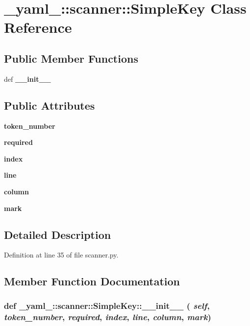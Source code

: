 \section{\_\-yaml\_\-::scanner::SimpleKey Class Reference}
\label{class__yaml___1_1scanner_1_1SimpleKey}
\subsection*{Public Member Functions}
\begin{CompactItemize}
\item 
def {\bf \_\-\_\-init\_\-\_\-}
\end{CompactItemize}
\subsection*{Public Attributes}
\begin{CompactItemize}
\item 
{\bf token\_\-number}
\item 
{\bf required}
\item 
{\bf index}
\item 
{\bf line}
\item 
{\bf column}
\item 
{\bf mark}
\end{CompactItemize}


\subsection{Detailed Description}


Definition at line 35 of file scanner.py.

\subsection{Member Function Documentation}
\subsubsection{\setlength{\rightskip}{0pt plus 5cm}def \_\-yaml\_\-::scanner::SimpleKey::\_\-\_\-init\_\-\_\- ( {\em self},  {\em token\_\-number},  {\em required},  {\em index},  {\em line},  {\em column},  {\em mark})}\label{class__yaml___1_1scanner_1_1SimpleKey_1bf2da43cfa8ef722480036c0582f1bb}




